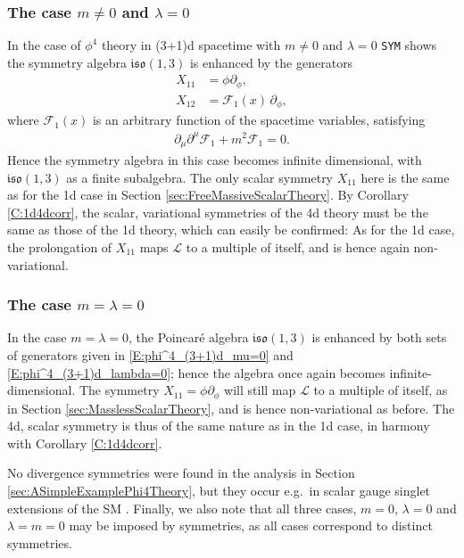 \documentclass[a4paper,hidelinks, 12pt]{article}
\numberwithin{equation}{section}
\theoremstyle{plain}
\newcommand{\La}{\mathfrak}
\newcommand{\nn}{\nonumber}
\newcommand{\mc}{\mathcal}
\begin{document}
\subsubsection{The case $m\ne 0$ and $\lambda=0$}
\label{sec:TheCaseMune0l0}
In the case of $\phi^4$ theory in (3+1)d spacetime with $m \ne 0$ and $\lambda = 0$
\texttt{SYM} \cite{dimas2005sym} shows the symmetry algebra $\La{iso}(1,3)$ is enhanced by the generators
\begin{align}\label{E:phi^4_(3+1)d_lambda=0}
	X_{11} &= \phi \partial_\phi, \nn \\
	X_{12} &= \mathcal{F}_{1}(x) \, \partial_{\phi},
\end{align}
where $\mathcal{F}_{1}(x)$ is an arbitrary function of the spacetime variables, satisfying 
\begin{align}\label{E:arbFu4d}
	\partial_\mu\partial^\mu \mathcal{F}_{1}+m^2\mathcal{F}_{1}=0.
\end{align}
Hence the symmetry algebra in this case becomes infinite dimensional, with $\La{iso}(1,3)$ as a finite subalgebra. The only scalar symmetry $X_{11}$ here is the same as for the 1d case in Section \ref{sec:FreeMassiveScalarTheory}. By
Corollary \ref{C:1d4dcorr}, the scalar, variational symmetries of the 4d theory must be the same as those of the 1d theory, which can easily be confirmed: As for the 1d case,
the prolongation of $X_{11}$ maps $\mc{L}$ to a multiple of itself, and is hence again non-variational. 

\subsubsection{The case $m=\lambda=0$}
\label{sec:TheCaseMu0l0}
In the case $m=\lambda=0$, the Poincaré algebra $\La{iso}(1,3)$ is enhanced by both sets of generators given in 
\eqref{E:phi^4_(3+1)d_mu=0} and \eqref{E:phi^4_(3+1)d_lambda=0}; hence 
the algebra once again becomes infinite-dimensional. The symmetry $X_{11}= \phi \partial_\phi$ will still map
$\mc{L}$ to a multiple of itself, as in Section \ref{sec:MasslessScalarTheory}, and is hence non-variational as before.
 The 4d, scalar symmetry is thus of the same nature as in the 1d case, in harmony with Corollary \ref{C:1d4dcorr}.

No divergence symmetries were found in the analysis in Section \ref{sec:ASimpleExamplePhi4Theory}, but they
occur e.g.~in scalar gauge singlet extensions of the SM \cite{singletExtensionsSM}.
Finally, we also note that all three cases, $m=0$, $\lambda=0$ and $\lambda=m=0$ may be imposed by symmetries, as all cases correspond to distinct symmetries.
\end{document}
